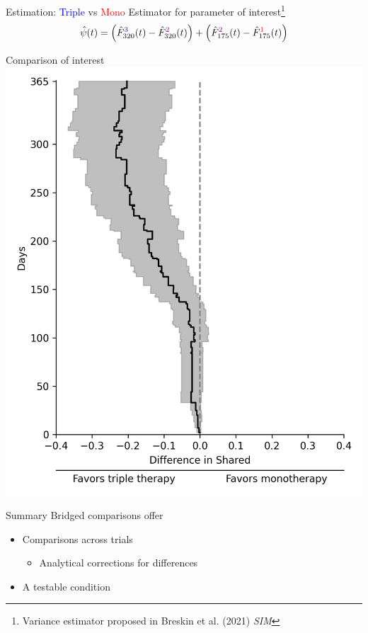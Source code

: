 \documentclass{beamer}
\newcommand{\blue}[1]{\textcolor{blue}{#1}}
\newcommand{\red}[1]{\textcolor{red}{#1}}
\newcommand{\violet}[1]{\textcolor{violet}{#1}}
\begin{document}
\begin{frame}{Estimation: \blue{Triple} vs \red{Mono}}
	Estimator for parameter of interest\footnote[frame]{Variance estimator proposed in Breskin et al. (2021) \textit{SIM}}
	\[\hat{\psi}(t) = \left(\hat{F}_{320}^{\blue{3}}(t) - \hat{F}_{320}^{\violet{2}}(t)\right) + \left(\hat{F}_{175}^{\violet{2}}(t) - \hat{F}_{175}^{\red{1}}(t)\right)\]
\end{frame}

\begin{frame}{Comparison of interest}
	\centering
	\includegraphics[scale=0.45]{images/results_twister.png}	
\end{frame}

\begin{frame}{Summary}
	Bridged comparisons offer
	\begin{itemize}
		\item Comparisons across trials
		\begin{itemize}
			\item Analytical corrections for differences
		\end{itemize}
		\item A testable condition
	\end{itemize}
\end{frame}
\end{document}
